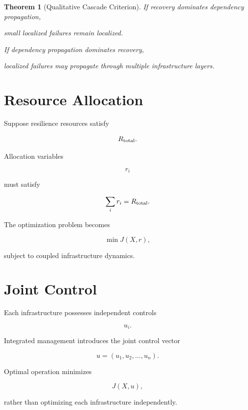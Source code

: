 \documentclass[11pt,fleqn]{book}
\numberwithin{equation}{chapter}
\theoremstyle{plain}
\newtheorem{theorem}{Theorem}[chapter]
\theoremstyle{definition}
\theoremstyle{remark}
\begin{document}

\begin{theorem}[Qualitative Cascade Criterion]

If recovery dominates dependency propagation,

small localized failures remain localized.

If dependency propagation dominates recovery,

localized failures may propagate through multiple infrastructure layers.

\end{theorem}


\section{Resource Allocation}

Suppose resilience resources satisfy

\[
R_{\rm total}.
\]

Allocation variables

\[
r_i
\]

must satisfy

\[
\sum_i
r_i
=
R_{\rm total}.
\]

The optimization problem becomes

\[
\boxed{
\min
J(X,r),
}
\]

subject to coupled infrastructure dynamics.


\section{Joint Control}

Each infrastructure possesses independent controls

\[
u_i.
\]

Integrated management introduces the joint control vector

\[
\boxed{
u
=
(u_1,u_2,\ldots,u_n).
}
\]

Optimal operation minimizes

\[
J(X,u),
\]

rather than optimizing each infrastructure independently.

\end{document}
